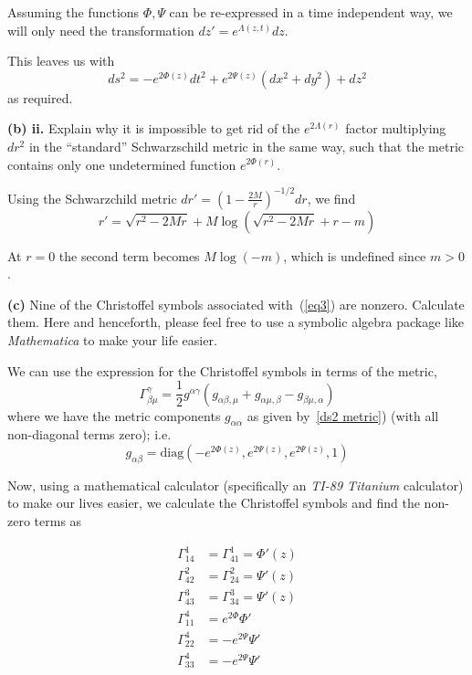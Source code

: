 \documentclass[a4paper]{article} %
\newcommand{\diag}{\text{diag}}
\begin{document}
Assuming the functions $\Phi,\Psi$ can be re-expressed in a time independent way, we will only need the transformation $dz'=e^{\Lambda(z,t)}dz$.

This leaves us with
\begin{equation}
ds^2=-e^{2\Phi(z)} dt^2+e^{2\Psi(z)}(dx^2+dy^2)+dz^2\label{ds2 metric}
\end{equation}
as required.



\begin{framed}
\textbf{(b) ii.} Explain why it is impossible to get rid of the $e^{2\Lambda(r)}$ factor multiplying $dr^2$ in the ``standard'' Schwarzschild metric in the same way, such that the metric contains only one undetermined function $e^{2\Phi(r)}$.
\end{framed}

Using the Schwarzchild metric $dr'=\left(1-\frac{2M}{r}\right)^{-1/2}dr$, we find
\begin{equation}
r'=\sqrt{r^2-2Mr}+M\log\left(\sqrt{r^2-2Mr}+r-m\right)
\end{equation}

At $r=0$ the second term becomes $M\log(-m)$, which is undefined since $m>0$.

\begin{framed}
\textbf{(c)} Nine of the Christoffel symbols associated with~(\ref{eq3}) are nonzero. Calculate them. Here and henceforth, please feel free to use a symbolic algebra package like \emph{Mathematica} to make your life easier.
\end{framed}

We can use the expression for the Christoffel symbols in terms of the metric,
\begin{equation}
\Gamma^{\gamma}_{\beta\mu}=\frac{1}{2}g^{\alpha\gamma}\left(
g_{\alpha\beta,\mu}+g_{\alpha\mu,\beta}-g_{\beta\mu,\alpha}\right)
\end{equation}
where we have the metric components $g_{\alpha\alpha}$ as given by~\ref{ds2 metric}) (with all non-diagonal terms zero); i.e.
\begin{equation}
g_{\alpha\beta}=\diag\left(-e^{2\Phi(z)},e^{2\Psi(z)},e^{2\Psi(z)},1\right)
\end{equation}

Now, using a mathematical calculator (specifically an \emph{TI-89 Titanium} calculator) to make our lives easier, we calculate the Christoffel symbols and find the non-zero terms as

\begin{align}
\Gamma^{1}_{14}&=\Gamma^{1}_{41}=\Phi'(z)\\
\Gamma^{2}_{42}&=\Gamma^{2}_{24}=\Psi'(z)\\
\Gamma^{3}_{43}&=\Gamma^{3}_{34}=\Psi'(z)\\
\Gamma^{4}_{11}&=e^{2\Phi}\Phi'\\
\Gamma^{4}_{22}&=-e^{2\Psi}\Psi'\\
\Gamma^{4}_{33}&=-e^{2\Psi}\Psi'
\end{align}
\end{document}
